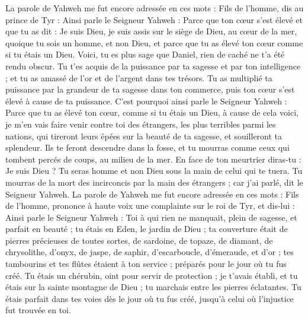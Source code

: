 \begin{multicols}{2}
\VerseOne{}La parole de Yahweh me fut encore adressée en ces mots :
Fils de l’homme, dis au prince de Tyr : Ainsi parle le Seigneur Yahweh : Parce que ton cœur s'est élevé et que tu as dit : Je suis Dieu, je suis assis sur le siège de Dieu, au cœur de la mer, quoique tu sois un homme, et non Dieu, et parce que tu as élevé ton cœur comme si tu étais un Dieu.
Voici, tu es plus sage que Daniel, rien de caché ne t'a été rendu obscur.
Tu t'es acquis de la puissance par ta sagesse et par ton intelligence ; et tu as amassé de l'or et de l'argent dans tes trésors.
Tu as multiplié ta puissance par la grandeur de ta sagesse dans ton commerce, puis ton cœur s'est élevé à cause de ta puissance.
C'est pourquoi ainsi parle le Seigneur Yahweh : Parce que tu as élevé ton cœur, comme si tu étais un Dieu,
à cause de cela voici, je m'en vais faire venir contre toi des étrangers, les plus terribles parmi les nations, qui tireront leurs épées sur la beauté de ta sagesse, et souilleront ta splendeur.
Ils te feront descendre dans la fosse, et tu mourras comme ceux qui tombent percés de coups, au milieu de la mer.
En face de ton meurtrier diras-tu : Je suis Dieu ? Tu seras homme et non Dieu sous la main de celui qui te tuera.
Tu mourras de la mort des incirconcis par la main des étrangers ; car j'ai parlé, dit le Seigneur Yahweh.
La parole de Yahweh me fut encore adressée en ces mots :
Fils de l’homme, prononce à haute voix une complainte sur le roi de Tyr, et dis-lui : Ainsi parle le Seigneur Yahweh : Toi à qui rien ne manquait, plein de sagesse, et parfait en beauté ;
tu étais en Eden, le jardin de Dieu ; ta couverture était de pierres précieuses de toutes sortes, de sardoine, de topaze, de diamant, de chrysolithe, d'onyx, de jaspe, de saphir, d'escarboucle, d'émeraude, et d'or ; tes tambourins et tes flûtes étaient à ton service ; préparés pour le jour où tu fus créé.
Tu étais un chérubin, oint pour servir de protection ; je t'avais établi, et tu étais sur la sainte montagne de Dieu ; tu marchais entre les pierres éclatantes.
Tu étais parfait dans tes voies dès le jour où tu fus créé, jusqu'à celui où l’injustice fut trouvée en toi.

\end{multicols}
